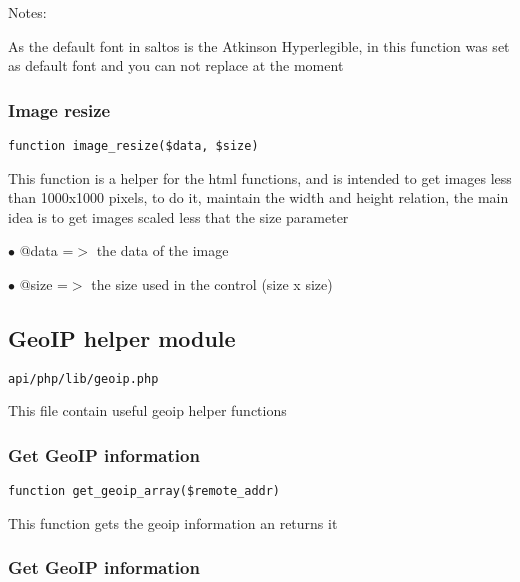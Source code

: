 \documentclass[a4paper]{article}
\begin{document}
Notes:

As the default font in saltos is the Atkinson Hyperlegible, in this
function was set as default font and you can not replace at the
moment

\hypertarget{toc455}{}
\subsubsection{Image resize}

\begin{lstlisting}
function image_resize($data, $size)
\end{lstlisting}

This function is a helper for the html functions, and is intended to
get images less than 1000x1000 pixels, to do it, maintain the width and
height relation, the main idea is to get images scaled less that the size
parameter

\begin{compactitem}
\item[\color{myblue}$\bullet$] @data =$>$ the data of the image
\item[\color{myblue}$\bullet$] @size =$>$ the size used in the control (size x size)
\end{compactitem}

\hypertarget{toc456}{}
\subsection{GeoIP helper module}

\begin{lstlisting}
api/php/lib/geoip.php
\end{lstlisting}

This file contain useful geoip helper functions

\hypertarget{toc457}{}
\subsubsection{Get GeoIP information}

\begin{lstlisting}
function get_geoip_array($remote_addr)
\end{lstlisting}

This function gets the geoip information an returns it

\hypertarget{toc458}{}
\subsubsection{Get GeoIP information}
\end{document}
